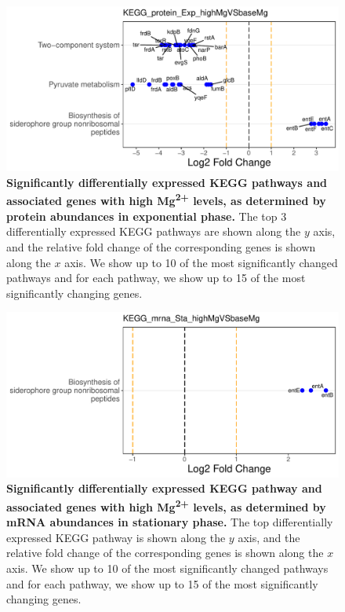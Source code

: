 \documentclass[a4paper]{article}
\begin{document}
\clearpage
\begin{figure}
	\includegraphics[width=1.0\textwidth]{../../d_figures/KEGG11_protein_Exp_highMgVSbaseMg_withTitle.pdf}
	\caption[Significantly differentially expressed KEGG pathways for protein samples in exponential phase tested for high Mg\textsuperscript{2+} against base Mg\textsuperscript{2+}]
	{\textbf{Significantly differentially expressed KEGG pathways and associated genes with high Mg\textsuperscript{2+} levels, as determined by protein abundances in exponential phase.} The top 3 differentially expressed KEGG pathways are shown along the $y$ axis, and the relative fold change of the corresponding genes is shown along the $x$ axis. We show up to 10 of the most significantly changed pathways and for each pathway, we show up to 15 of the most significantly changing genes.}
\end{figure}

\clearpage
\begin{figure}
	\includegraphics[width=1.0\textwidth]{../../d_figures/KEGG12_mrna_Sta_highMgVSbaseMg_withTitle.pdf}
	\caption[Significantly differentially expressed KEGG pathway for mRNA samples in stationary phase tested for high Mg\textsuperscript{2+} against base Mg\textsuperscript{2+}]
	{\textbf{Significantly differentially expressed KEGG pathway and associated genes with high Mg\textsuperscript{2+} levels, as determined by mRNA abundances in stationary phase.} The top differentially expressed KEGG pathway is shown along the $y$ axis, and the relative fold change of the corresponding genes is shown along the $x$ axis. We show up to 10 of the most significantly changed pathways and for each pathway, we show up to 15 of the most significantly changing genes.}
\end{figure}
\end{document}
